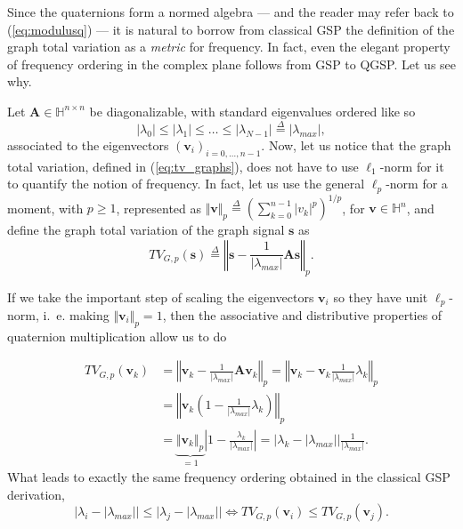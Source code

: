 Since the quaternions form a normed algebra --- and the reader may refer back to (\ref{eq:modulusq}) --- it is natural to borrow from classical GSP the definition of the graph total variation as a \textit{metric} for frequency. In fact, even the elegant property of frequency ordering in the complex plane follows from GSP to QGSP. Let us see why.

Let $ \mathbf{A} \in \mathbb{H}^{n \times n}$ be diagonalizable, with standard eigenvalues ordered like so
\begin{equation}
\label{eq:eig_order_q}
|\lambda_0| \leq |\lambda_1| \leq \dots \leq |\lambda_{N-1}| \overset{\Delta}{=} |\lambda_{max}|,
\end{equation}
associated to the eigenvectors $ (\mathbf{v}_i)_{i=0,\dots,n-1} $.
Now, let us notice that the graph total variation, defined in (\ref{eq:tv_graphs}), does not have to use $ \ell_1 $-norm for it to quantify the notion of frequency. In fact, let us use the general $ \ell_p $-norm for a moment, with $p \geq 1$, represented as $ \Vert \mathbf{v}\Vert_p \overset{\Delta}{=} \left(\sum_{k=0}^{n-1} |v_k|^p\right)^{1/p} $, for $\mathbf{v} \in \mathbb{H}^n$, and define the graph total variation of the graph signal $\mathbf{s}$ as
\begin{equation}
\label{eq:tv_graphsq}
TV_{G, p}(\mathbf{s}) \overset{\Delta}{=} \left\Vert \mathbf{s} - \frac{1}{|\lambda_{max}|}\mathbf{A} \mathbf{s} \right\Vert_p.
\end{equation}

If we take the important step of scaling the eigenvectors $\mathbf{v}_i$ so they have unit $\ell_p$-norm, i.~e. making $\Vert \mathbf{v}_i\Vert_p = 1$, then the associative and distributive properties of quaternion multiplication allow us to do

\begin{equation}
\begin{aligned}
TV_{G, p}(\mathbf{v}_k) &=
\left\Vert \mathbf{v}_k - \frac{1}{|\lambda_{max}|} \mathbf{A} \mathbf{v}_k \right\Vert_p =
\left\Vert\mathbf{v}_k - \mathbf{v}_k \frac{1}{|\lambda_{max}|} \lambda_k \right\Vert_p \\
&= \left\Vert\mathbf{v}_k \left( 1 -  \frac{1}{|\lambda_{max}|} \lambda_k \right) \right\Vert_p \\
&=
\underbrace{\Vert \mathbf{v}_k \Vert_p}_{= 1} \left|1 - \frac{\lambda_k}{|\lambda_{max}|}\right| = \Big| \lambda_k - |\lambda_{max}| \Big| \frac{1}{|\lambda_{max}|}.
\end{aligned}
\end{equation}
What leads to exactly the same frequency ordering obtained in the classical GSP derivation,
\begin{equation}
\label{eq:TV_ordering_q}
\Big| \! \lambda_i  - \! |\lambda_{max}|\Big| \! \leq \! \Big|  \lambda_j  - \! |\lambda_{max}|\Big| \! \! \iff \! \! TV_{G, p}(\mathbf{v}_i) \leq TV_{G, p}(\mathbf{v}_j).
\end{equation}

